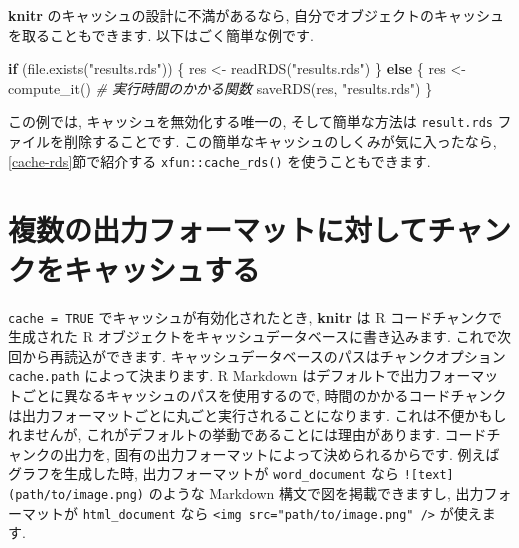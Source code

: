 \documentclass[
  11pt,
  lualatex,ja=standard,jafont=noto]{bxjsreport}
\newenvironment{Shaded}{\begin{snugshade}}{\end{snugshade}}
\newcommand{\CommentTok}[1]{\textcolor[rgb]{0.56,0.35,0.01}{\textit{#1}}}
\newcommand{\ControlFlowTok}[1]{\textcolor[rgb]{0.13,0.29,0.53}{\textbf{#1}}}
\newcommand{\FunctionTok}[1]{\textcolor[rgb]{0.00,0.00,0.00}{#1}}
\newcommand{\NormalTok}[1]{#1}
\newcommand{\OtherTok}[1]{\textcolor[rgb]{0.56,0.35,0.01}{#1}}
\newcommand{\StringTok}[1]{\textcolor[rgb]{0.31,0.60,0.02}{#1}}
\begin{document}
\textbf{knitr} のキャッシュの設計に不満があるなら, 自分でオブジェクトのキャッシュを取ることもできます. 以下はごく簡単な例です.

\begin{Shaded}
\begin{Highlighting}[numbers=left,,]
\ControlFlowTok{if}\NormalTok{ (}\FunctionTok{file.exists}\NormalTok{(}\StringTok{"results.rds"}\NormalTok{)) \{}
\NormalTok{  res }\OtherTok{\textless{}{-}} \FunctionTok{readRDS}\NormalTok{(}\StringTok{"results.rds"}\NormalTok{)}
\NormalTok{\} }\ControlFlowTok{else}\NormalTok{ \{}
\NormalTok{  res }\OtherTok{\textless{}{-}} \FunctionTok{compute\_it}\NormalTok{()  }\CommentTok{\# 実行時間のかかる関数}
  \FunctionTok{saveRDS}\NormalTok{(res, }\StringTok{"results.rds"}\NormalTok{)}
\NormalTok{\}}
\end{Highlighting}
\end{Shaded}

この例では, キャッシュを無効化する唯一の, そして簡単な方法は \texttt{result.rds} ファイルを削除することです. この簡単なキャッシュのしくみが気に入ったなら, \ref{cache-rds}節で紹介する \texttt{xfun::cache\_rds()} を使うこともできます.

\hypertarget{cache-path}{%
\section{複数の出力フォーマットに対してチャンクをキャッシュする}\label{cache-path}}

\texttt{cache = TRUE} でキャッシュが有効化されたとき, \textbf{knitr} は R コードチャンクで生成された R オブジェクトをキャッシュデータベースに書き込みます. これで次回から再読込ができます. キャッシュデータベースのパスはチャンクオプション \texttt{cache.path} によって決まります. R Markdown はデフォルトで出力フォーマットごとに異なるキャッシュのパスを使用するので, 時間のかかるコードチャンクは出力フォーマットごとに丸ごと実行されることになります. これは不便かもしれませんが, これがデフォルトの挙動であることには理由があります. コードチャンクの出力を, 固有の出力フォーマットによって決められるからです. 例えばグラフを生成した時, 出力フォーマットが \texttt{word\_document} なら \texttt{!{[}text{]}(path/to/image.png)} のような Markdown 構文で図を掲載できますし, 出力フォーマットが \texttt{html\_document} なら \texttt{\textless{}img\ src="path/to/image.png"\ /\textgreater{}} が使えます.
\end{document}
